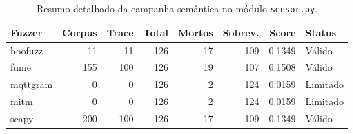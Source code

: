 \begin{table}[htbp]
\centering
\caption{Resumo detalhado da campanha semântica no módulo \texttt{sensor.py}.}
\label{tab:resultados_sensor_detalhado}
\begin{tabular}{lrrrrrrl}
\hline
\textbf{Fuzzer} & \textbf{Corpus} & \textbf{Trace} & \textbf{Total} & \textbf{Mortos} & \textbf{Sobrev.} & \textbf{Score} & \textbf{Status} \\
\hline
boofuzz & 11 & 11 & 126 & 17 & 109 & 0.1349 & Válido \\
fume & 155 & 100 & 126 & 19 & 107 & 0.1508 & Válido \\
mqttgram & 0 & 0 & 126 & 2 & 124 & 0.0159 & Limitado \\
mitm & 0 & 0 & 126 & 2 & 124 & 0.0159 & Limitado \\
scapy & 200 & 100 & 126 & 17 & 109 & 0.1349 & Válido \\
\hline
\end{tabular}
\end{table}
